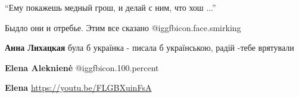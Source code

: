 \begin{itemize}
\begin{itemize}
\enquote{Ему покажешь медный грош, и делай с ним, что хош ...}

Быдло они и отребье. Этим все сказано  @igg{fbicon.face.smirking} 

\textbf{Анна Лихацкая} була б українка - писала б українською, радій -тебе врятували

\textbf{Elena Aleknienė}  @igg{fbicon.100.percent} 

\textbf{Elena} \url{https://youtu.be/FLGBXuinFsA}

\end{itemize} %

\end{itemize} %
